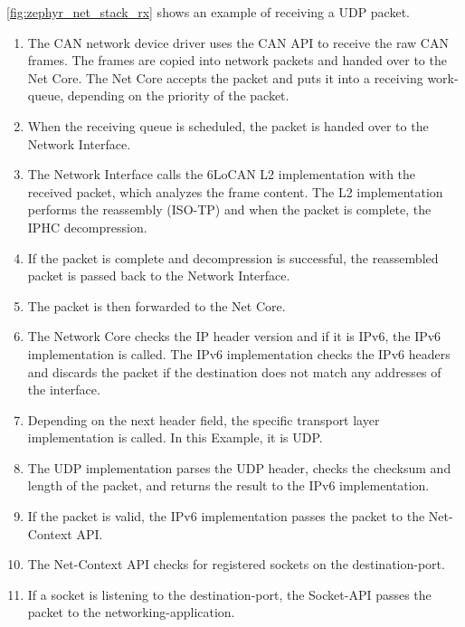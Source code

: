 \autoref{fig:zephyr_net_stack_rx} shows an example of receiving a UDP packet.
\begin{enumerate}
        \item The CAN network device driver uses the CAN API to receive the raw CAN frames.
              The frames are copied into network packets and handed over to the Net Core.
              The Net Core accepts the packet and puts it into a receiving work-queue, depending on the priority of the packet.
        \item When the receiving queue is scheduled, the packet is handed over to the Network Interface.
        \item The Network Interface calls the 6LoCAN L2 implementation with the received packet, which analyzes the frame content.
              The L2 implementation performs the reassembly (ISO-TP) and when the packet is complete, the IPHC decompression.
        \item If the packet is complete and decompression is successful, the reassembled packet is passed back to the Network Interface.
        \item The packet is then forwarded to the Net Core.
        \item The Network Core checks the IP header version and if it is IPv6, the IPv6 implementation is called.
              The IPv6 implementation checks the IPv6 headers and discards the packet if the destination does not match any addresses of the interface.
        \item Depending on the next header field, the specific transport layer implementation is called. In this Example, it is UDP.
        \item The UDP implementation parses the UDP header, checks the checksum and length of the packet, and returns the result to the IPv6 implementation.
        \item If the packet is valid, the IPv6 implementation passes the packet to the Net-Context API.
        \item The Net-Context API checks for registered sockets on the destination-port.
        \item If a socket is listening to the destination-port, the Socket-API passes the packet to the networking-application.
\end{enumerate}

\newpage


